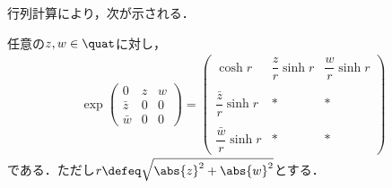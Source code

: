 \begin{nttdef}
\end{nttdef}

行列計算により，次が示される．
\begin{lem}\label{lem:exp-quat}
  
  任意の$ z,w\in \quat$に対し，
  \begin{align*}
    \exp
    \begin{pmatrix}
      0 & z & w  \\
      \bar{z} & 0 & 0\\
      \bar{w} & 0 & 0
    \end{pmatrix}
                    =
                    \begin{pmatrix}
                      \cosh r &  \dfrac{z}{r} \sinh r & \dfrac{w}{r}\sinh r \\
                      \\
                      \dfrac{\bar{z}}{r} \sinh r &  \ast & \ast \\
                      \\
                      \dfrac{\bar{w}}{r}\sinh r &  \ast & \ast 
                    \end{pmatrix}
  \end{align*}
  である．ただし$r \defeq \sqrt{\abs{z}^2 + \abs{w}^2 } $とする．
\end{lem}

